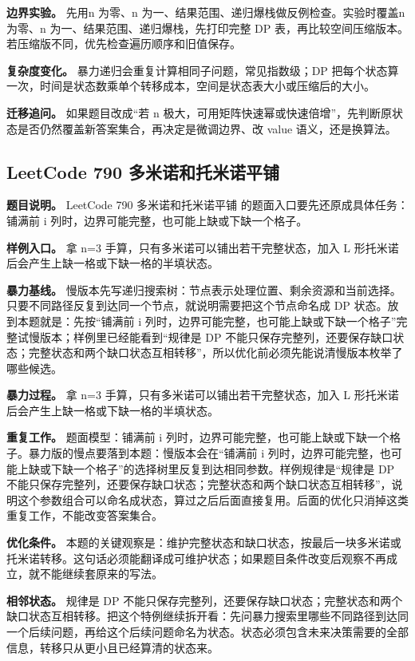 \textbf{边界实验。} 先用n 为零、n 为一、结果范围、递归爆栈做反例检查。实验时覆盖n 为零、n 为一、结果范围、递归爆栈，先打印完整 DP 表，再比较空间压缩版本。若压缩版不同，优先检查遍历顺序和旧值保存。

\textbf{复杂度变化。} 暴力递归会重复计算相同子问题，常见指数级；DP 把每个状态算一次，时间是状态数乘单个转移成本，空间是状态表大小或压缩后的大小。

\textbf{迁移追问。} 如果题目改成“若 n 极大，可用矩阵快速幂或快速倍增”，先判断原状态是否仍然覆盖新答案集合，再决定是微调边界、改 value 语义，还是换算法。

\subsection{LeetCode 790 多米诺和托米诺平铺}

\textbf{题目说明。} LeetCode 790 多米诺和托米诺平铺 的题面入口要先还原成具体任务：铺满前 i 列时，边界可能完整，也可能上缺或下缺一个格子。

\textbf{样例入口。} 拿 n=3 手算，只有多米诺可以铺出若干完整状态，加入 L 形托米诺后会产生上缺一格或下缺一格的半填状态。

\textbf{暴力基线。} 慢版本先写递归搜索树：节点表示处理位置、剩余资源和当前选择。只要不同路径反复到达同一个节点，就说明需要把这个节点命名成 DP 状态。放到本题就是：先按“铺满前 i 列时，边界可能完整，也可能上缺或下缺一个格子”完整试慢版本；样例里已经能看到“规律是 DP 不能只保存完整列，还要保存缺口状态；完整状态和两个缺口状态互相转移”，所以优化前必须先能说清慢版本枚举了哪些候选。

\textbf{暴力过程。} 拿 n=3 手算，只有多米诺可以铺出若干完整状态，加入 L 形托米诺后会产生上缺一格或下缺一格的半填状态。

\textbf{重复工作。} 题面模型：铺满前 i 列时，边界可能完整，也可能上缺或下缺一个格子。暴力版的慢点要落到本题：慢版本会在“铺满前 i 列时，边界可能完整，也可能上缺或下缺一个格子”的选择树里反复到达相同参数。样例规律是“规律是 DP 不能只保存完整列，还要保存缺口状态；完整状态和两个缺口状态互相转移”，说明这个参数组合可以命名成状态，算过之后后面直接复用。后面的优化只消掉这类重复工作，不能改变答案集合。

\textbf{优化条件。} 本题的关键观察是：维护完整状态和缺口状态，按最后一块多米诺或托米诺转移。这句话必须能翻译成可维护状态；如果题目条件改变后观察不再成立，就不能继续套原来的写法。

\textbf{相邻状态。} 规律是 DP 不能只保存完整列，还要保存缺口状态；完整状态和两个缺口状态互相转移。把这个特例继续拆开看：先问暴力搜索里哪些不同路径到达同一个后续问题，再给这个后续问题命名为状态。状态必须包含未来决策需要的全部信息，转移只从更小且已经算清的状态来。

